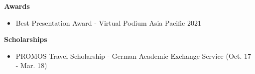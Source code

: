 \datedsubsection{}
{%
}
{%
	\textbf{Awards}
}
{%
	\begin{itemize}
		\item Best Presentation Award - Virtual Podium Asia Pacific 2021
	\end{itemize}
}

\datedsubsection{}
{%
}
{%
	\textbf{Scholarships}
}
{%

	\begin{itemize}
		\item PROMOS Travel Scholarship - German Academic Exchange Service (Oct. 17 - Mar. 18)
	\end{itemize}

}


